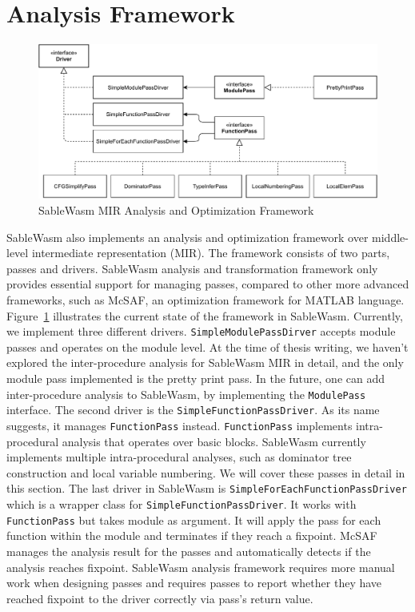\section{Analysis Framework}
\begin{figure}
    \centering
    \includegraphics[width=\textwidth]{Images/4.MIR/analysis-framework.pdf}
    \caption{SableWasm MIR Analysis and Optimization Framework}
    \label{fig:sablewasm-mir-analysis-framework}
\end{figure}
SableWasm also implements an analysis and optimization framework over middle-level intermediate representation (MIR). The framework consists of two parts, passes and drivers. SableWasm analysis and transformation framework only provides essential support for managing passes, compared to other more advanced frameworks, such as McSAF\cite{mcsaf}, an optimization framework for MATLAB language. Figure~\ref{fig:sablewasm-mir-analysis-framework} illustrates the current state of the framework in SableWasm. Currently, we implement three different drivers. \texttt{SimpleModulePassDirver} accepts module passes and operates on the module level. At the time of thesis writing, we haven't explored the inter-procedure analysis for SableWasm MIR in detail, and the only module pass implemented is the pretty print pass. In the future, one can add inter-procedure analysis to SableWasm, by implementing the \texttt{ModulePass} interface. The second driver is the \texttt{SimpleFunctionPassDriver}. As its name suggests, it manages \texttt{FunctionPass} instead. \texttt{FunctionPass} implements intra-procedural analysis that operates over basic blocks. SableWasm currently implements multiple intra-procedural analyses, such as dominator tree construction and local variable numbering. We will cover these passes in detail in this section. The last driver in SableWasm is \texttt{SimpleForEachFunctionPassDriver} which is a wrapper class for \texttt{SimpleFunctionPassDriver}. It works with \texttt{FunctionPass} but takes module as argument. It will apply the pass for each function within the module and terminates if they reach a fixpoint. McSAF manages the analysis result for the passes and automatically detects if the analysis reaches fixpoint. SableWasm analysis framework requires more manual work when designing passes and requires passes to report whether they have reached fixpoint to the driver correctly via pass's return value.

